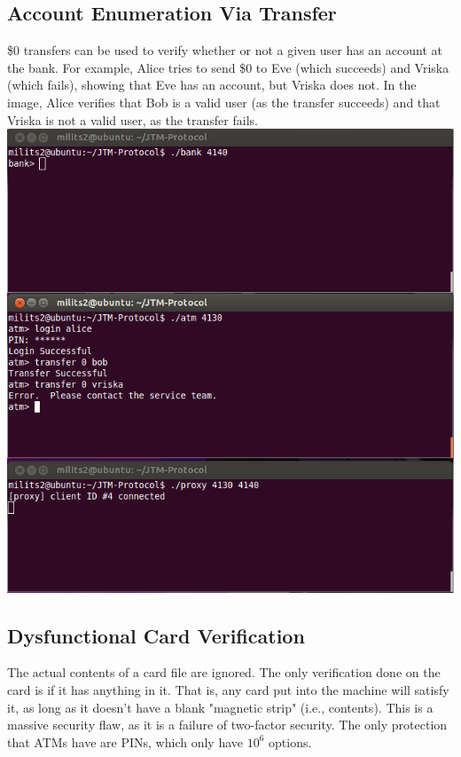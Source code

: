 \documentclass{article}
\begin{document}
\subsection{Account Enumeration Via Transfer}
\$0 transfers can be used to verify whether or not a given user has an account at the bank. For example, Alice tries to send \$0 to Eve (which succeeds) and Vriska (which fails), showing that Eve has an account, but Vriska does not. In the image, Alice verifies that Bob is a valid user (as the transfer succeeds) and that Vriska is not a valid user, as the transfer fails.
\\
\includegraphics[scale=0.5]{transferUser.png}
\\

\subsection{Dysfunctional Card Verification}
The actual contents of a card file are ignored. The only verification done on the card is if it has anything in it. That is, any card put into the machine will satisfy it, as long as it doesn't have a blank "magnetic strip" (i.e., contents). This is a massive security flaw, as it is a failure of two-factor security. The only protection that ATMs have are PINs, which only have $10^6$ options.
\end{document}
